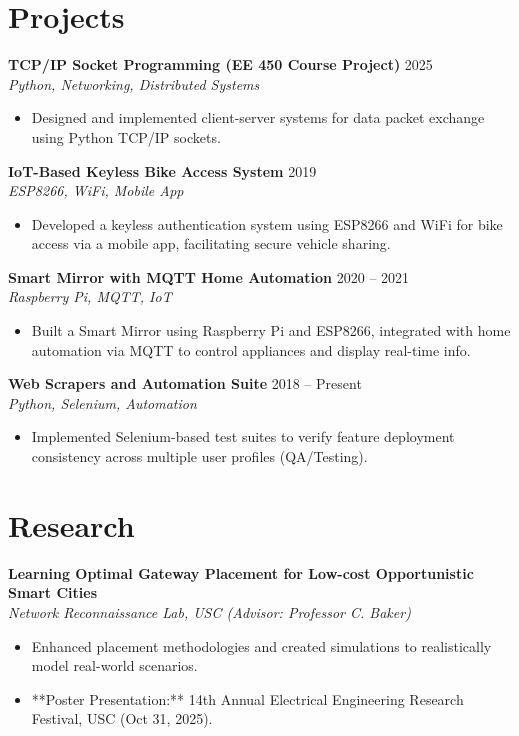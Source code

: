 \documentclass[letterpaper,10pt]{article}
\begin{document}
\section*{Projects}
\textbf{TCP/IP Socket Programming (EE 450 Course Project)} \hfill 2025 \\
\textit{Python, Networking, Distributed Systems}
\begin{itemize} \itemsep -2pt
    \item Designed and implemented client-server systems for data packet exchange using Python TCP/IP sockets.
\end{itemize}

\textbf{IoT-Based Keyless Bike Access System} \hfill 2019 \\
\textit{ESP8266, WiFi, Mobile App}
\begin{itemize} \itemsep -2pt
    \item Developed a keyless authentication system using ESP8266 and WiFi for bike access via a mobile app, facilitating secure vehicle sharing.
\end{itemize}

\textbf{Smart Mirror with MQTT Home Automation} \hfill 2020 -- 2021 \\
\textit{Raspberry Pi, MQTT, IoT}
\begin{itemize} \itemsep -2pt
    \item Built a Smart Mirror using Raspberry Pi and ESP8266, integrated with home automation via MQTT to control appliances and display real-time info.
\end{itemize}

\textbf{Web Scrapers and Automation Suite} \hfill 2018 -- Present \\
\textit{Python, Selenium, Automation}
\begin{itemize} \itemsep -2pt
    \item Implemented Selenium-based test suites to verify feature deployment consistency across multiple user profiles (QA/Testing).
\end{itemize}

\section*{Research}
\textbf{Learning Optimal Gateway Placement for Low-cost Opportunistic Smart Cities} \\
\textit{Network Reconnaissance Lab, USC (Advisor: Professor C. Baker)}
\begin{itemize} \itemsep -2pt
    \item Enhanced placement methodologies and created simulations to realistically model real-world scenarios.
    \item **Poster Presentation:** 14th Annual Electrical Engineering Research Festival, USC (Oct 31, 2025).
\end{itemize}
\end{document}
